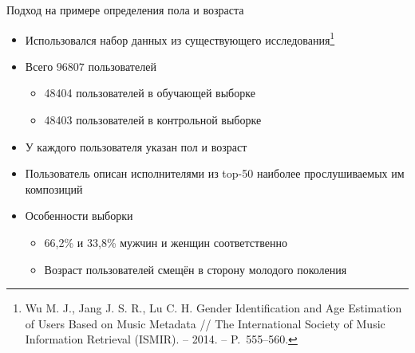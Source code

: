 \documentclass{beamer}
\begin{document}
\begin{frame}{Подход на примере определения пола и возраста}
    \begin{itemize}
        \item {Использовался набор данных из существующего 
              исследования\footnote{Wu M. J.,
              Jang J. S. R., Lu C. H. Gender Identification
              and Age Estimation of Users Based on Music 
              Metadata // The International Society of Music Information Retrieval (ISMIR). – 2014. – P.~555--560.}}
        \item {Всего $96807$ пользователей}
            \begin{itemize}
                \item {48404 пользователей в обучающей выборке}
                \item {48403 пользователей в контрольной выборке}
            \end{itemize}
        \item {У каждого пользователя указан пол и возраст}
        \item {Пользователь описан исполнителями из top-50 наиболее
            прослушиваемых им композиций}
        \item {Особенности выборки}
            \begin{itemize}
                \item {66{,}2\% и 33{,}8\% мужчин и женщин соответственно}
                \item {Возраст пользователей смещён в сторону молодого поколения}
            \end{itemize}
    \end{itemize}
\end{frame}
\end{document}
